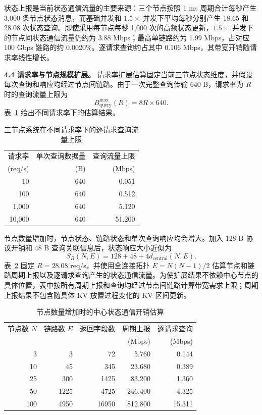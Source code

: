状态上报是当前状态通信流量的主要来源：三个节点按照 1 ms 周期合计每秒产生 3,000 条节点状态消息，而基础并发和 \(1.5\times\) 并发下平均每秒分别产生 18.65 和 28.08 次状态查询。即使采用每节点每秒 1,000 次的高频状态更新，\(1.5\times\) 并发下的节点间状态通信流量仍约为 3.88 Mbps；最高单链路约为 1.99 Mbps，占对应 100 Gbps 链路的约 0.0020\%。逐请求查询约占其中 0.106 Mbps，其带宽开销随请求率线性增长。

\textbf{4.4 请求率与节点规模扩展。}
请求率扩展估算固定当前三节点状态维度，并假设每次查询和响应均经过节点间链路。由于一次完整查询传输 640 B，请求率为 \(R\) 时的查询流量上限为
\[
B_{\mathrm{query}}^{\max}(R)
=8R\times640.
\]
表~\ref{tab:control-plane-rps-scale} 给出不同请求率下的估算结果。

\begin{table}[H]
\centering
\small
\caption{三节点系统在不同请求率下的逐请求查询流量上限}
\label{tab:control-plane-rps-scale}
\begin{tabular}{@{}rrr@{}}
\toprule
请求率 & 单次查询数据量 & 查询流量上限 \\
(req/s) & (B) & (Mbps) \\
\midrule
10 & 640 & 0.051 \\
100 & 640 & 0.512 \\
1,000 & 640 & 5.120 \\
10,000 & 640 & 51.200 \\
\bottomrule
\end{tabular}
\end{table}

节点数量增加时，节点状态、链路状态和单次查询响应均会增大。加入 128 B 协议开销和 48 B 查询关联信息后，状态响应大小近似为
\[
S_R(N,E)
=128+48+4d_{\mathrm{central}}(N,E).
\]
表~\ref{tab:control-plane-node-scale} 固定 \(R=28.08\) req/s，并使用全连接拓扑 \(E=N(N-1)/2\) 估算节点和链路周期上报以及逐请求查询产生的状态通信流量。为使扩展结果不依赖中心节点的具体位置，表中按所有周期上报和查询均经过节点间链路计算带宽需求上限；周期上报结果不包含随具体 KV 放置过程变化的 KV 区间更新。

\begin{table}[H]
\centering
\small
\caption{节点数量增加时的中心状态通信开销估算}
\label{tab:control-plane-node-scale}
\begin{tabular}{@{}rrrrr@{}}
\toprule
节点数 \(N\) & 链路数 \(E\) & 返回字段数 & 周期上报 & 逐请求查询 \\
 & & & (Mbps) & (Mbps) \\
\midrule
3 & 3 & 72 & 5.760 & 0.144 \\
10 & 45 & 345 & 23.680 & 0.389 \\
25 & 300 & 1425 & 83.200 & 1.360 \\
50 & 1225 & 4725 & 246.400 & 4.325 \\
100 & 4950 & 16950 & 812.800 & 15.311 \\
\bottomrule
\end{tabular}
\end{table}

